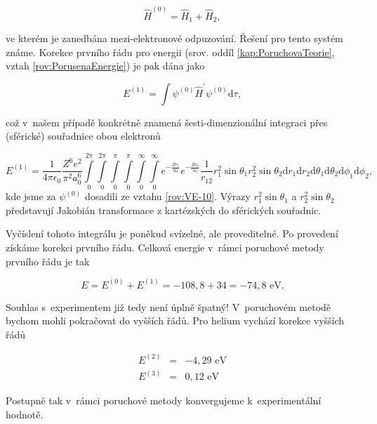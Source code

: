 \begin{equation}
\hat{H}^{(0)} = \hat{H}_1 + \hat{H}_2,
\label{rov:VE-12}
\end{equation}

\noindent ve kterém je zanedbána mezi-elektronové odpuzování. Řešení pro tento systém známe. Korekce prvního řádu pro energii (srov. oddíl \ref{kap:PoruchovaTeorie}, vztah \eqref{rov:PorusenaEnergie}) je pak dána jako

\begin{equation}
E^{(1)} = \int \psi^{(0)} \hat{H}^{\prime} \psi^{(0)} \mathrm{d}\tau,
\label{rov:VE-13}
\end{equation}

\noindent což v~našem případě konkrétně znamená šesti-dimenzionální integraci přes (sférické) souřadnice obou elektronů 

\begin{equation}
E^{(1)} = \frac{1}{4 \pi \epsilon_0} \frac{Z^6 e^2}{\pi^2 a_0^6} \int \limits_0^{2 \pi} \int \limits_0^{2 \pi} \int \limits_0^{\pi} \int \limits_0^{\pi} \int \limits_0^{\infty} \int \limits_0^{\infty} e^{-\frac{Z r_1}{a_0}} e^{-\frac{Z r_2}{a_0}} \frac{1}{r_{12}} r_1^2 \sin \theta_1 r_2^2 \sin \theta_2 \mathrm{d}r_1 \mathrm{d}r_2 \mathrm{d} \theta_1 \mathrm{d}\theta_2 \mathrm{d}\phi_1 \mathrm{d}\phi_2,
\label{rov:VE-14}
\end{equation}
kde jsme za $\psi^{(0)}$ dosadili ze vztahu \eqref{rov:VE-10}. Výrazy $r_1^2 \sin \theta_1$ a $r_2^2 \sin \theta_2$ představují Jakobián transformace z kartézských do sférických souřadnic.

Vyčíslení tohoto integrálu je poněkud svízelné, ale proveditelné. Po provedení získáme korekci prvního řádu. Celková energie v~rámci poruchové metody prvního řádu je tak 

\begin{equation}
E= E^{(0)} + E^{(1)} = -108{,}8 + 34=-74{,}8 \mbox{ eV}.
\label{rov:VE-15}
\end{equation}

Souhlas s~experimentem již tedy není úplně špatný! V~poruchovém metodě bychom mohli pokračovat do vyšších řádů. Pro helium vychází korekce vyšších řádů

\begin{eqnarray*}
E^{(2)} &=& -4{,}29 \mbox{ eV}\\
E^{(3)} &=& 0{,}12 \mbox{ eV}
\end{eqnarray*}

Postupně tak v~rámci poruchové metody konvergujeme k~experimentální hodnotě.

